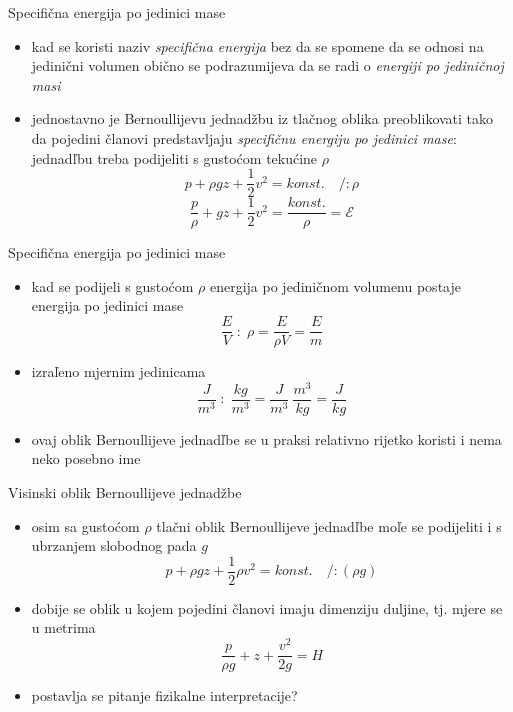 \documentclass[croatian]{beamer}
\begin{document}
\begin{frame}{Specifična energija po jedinici mase}

\begin{itemize}
\item kad se koristi naziv \emph{specifična energija} bez da se spomene
da se odnosi na jedinični volumen obično se podrazumijeva da se radi
o \emph{energiji po jediničnoj masi}
\item jednostavno je Bernoullijevu jednadžbu iz tlačnog oblika preoblikovati
tako da pojedini članovi predstavljaju \emph{specifičnu energiju po
jedinici mase}: jednadľbu treba podijeliti s gustoćom tekućine $\rho$
\[
p+\rho gz+\frac{1}{2}v^{2}=konst.\quad/:\rho
\]
\[
\frac{p}{\rho}+gz+\frac{1}{2}v^{2}=\frac{konst.}{\rho}=\mathcal{E}
\]
\end{itemize}
\end{frame}

\begin{frame}{Specifična energija po jedinici mase}

\begin{itemize}
\item kad se podijeli s gustoćom $\rho$ energija po jediničnom volumenu
postaje energija po jedinici mase
\[
\frac{E}{V}\;:\;\rho=\frac{E}{\rho V}=\frac{E}{m}
\]
\item izraľeno mjernim jedinicama
\[
\frac{J}{m^{3}}\;:\;\frac{kg}{m^{3}}=\frac{J}{m^{3}}\:\frac{m^{3}}{kg}=\frac{J}{kg}
\]
\item ovaj oblik Bernoullijeve jednadľbe se u praksi relativno rijetko koristi
i nema neko posebno ime
\end{itemize}
\end{frame}

\begin{frame}{Visinski oblik Bernoullijeve jednadžbe}

\begin{itemize}
\item osim sa gustoćom $\rho$ tlačni oblik Bernoullijeve jednadľbe moľe
se podijeliti i s ubrzanjem slobodnog pada $g$ 
\[
p+\rho gz+\frac{1}{2}\rho v^{2}=konst.\quad/:(\rho g)
\]
\item dobije se oblik u kojem pojedini članovi imaju dimenziju duljine,
tj. mjere se u metrima
\[
\frac{p}{\rho g}+z+\frac{v^{2}}{2g}=H
\]
\item postavlja se pitanje fizikalne interpretacije?
\end{itemize}
\end{frame}
\end{document}
